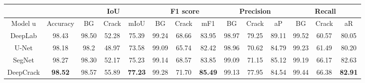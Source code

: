 \documentclass[a4paper,12pt]{report}
\begin{document}
\begin{table}[ht]
    \begin{adjustbox}{width=\columnwidth,center}
        \begin{tabular}{|c|c|c|c|c|c|c|c|c|c|c|c|c|c|}
            \hline
                                                              &                & \multicolumn{3}{|c|}{\textbf{IoU}} & \multicolumn{3}{|c|}{\textbf{F1 score}} & \multicolumn{3}{|c|}{\textbf{Precision}} & \multicolumn{3}{|c|}{\textbf{Recall}}                                                                                                      \\
            \hline
            {Model}                               u           & {Accuracy}     & {BG}                               & {Crack}                                 & {mIoU}                                   & {BG}                                  & {Crack} & {mF1}          & {BG}    & {Crack} & {aP}           & {BG}    & {Crack} & {aR}           \\
            \hline
            {DeepLab \cite{chen_encoder-decoder_2018}}        & {98.43}        & {98.50}                            & {52.28}                                 & {75.39}                                  & {99.24}                               & {68.66} & {83.95}        & {98.97} & {79.25} & {89.11}        & {99.52} & {60.57} & {80.05}        \\
            \hline
            {U-Net \cite{}}                                   & {98.18}        & {98.2}                             & {48.97}                                 & {73.58}                                  & {99.09}                               & {65.74} & {82.42}        & {98.96} & {70.62} & {84.79}        & {99.23} & {61.49} & {80.20}        \\
            \hline
            {SegNet\cite{chen_pavement_2020}}                 & {98.27}        & {98.30}                            & {52.17}                                 & {75.23}                                  & {99.14}                               & {68.57} & {83.85}        & {99.09} & {71.15} & {85.12}        & {99.19} & {66.17} & {82.63}        \\
            \hline
            {DeepCrack\cite{liu_deepcrack_2019}}              & \textbf{98.52} & {98.57}                            & {55.89}                                 & \textbf{77.23}                           & {99.28}                               & {71.70} & \textbf{85.49} & {99.13} & {77.95} & {84.54}        & {99.44} & {66.38} & \textbf{82.91} \\

\end{tabular}
\end{adjustbox}
\end{table}
\end{document}
